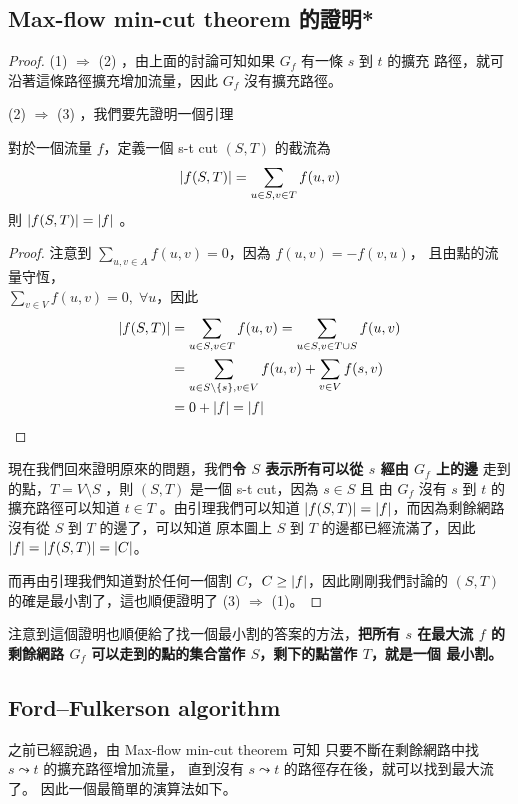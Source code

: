 \documentclass[a4paper,12pt]{book}
\begin{document}
\subsection{Max-flow min-cut theorem 的證明*}
\begin{proof}
  (1) $\Rightarrow$ (2) ，由上面的討論可知如果 $G_f$ 有一條 $s$ 到 $t$ 的擴充
  路徑，就可沿著這條路徑擴充增加流量，因此 $G_f$ 沒有擴充路徑。 
  
  (2) $\Rightarrow$ (3) ，我們要先證明一個引理
\begin{lemma}
  對於一個流量 $f$，定義一個 s-t cut $(S, T)$ 的截流為
  \[ \lvert f(S, T) \rvert = \sum_{u \in S, v \in T} f(u, v) \]
  則 $\lvert f(S, T) \rvert = \lvert f \rvert$ 。
\end{lemma}
\begin{proof}
  注意到 $\sum\limits_{u, v \in A} f(u, v) = 0$，因為 $f(u, v) = -f(v, u)$，
  且由點的流量守恆，\\$\sum\limits_{v \in V} f(u, v) = 0, \; \forall u$，因此
  \begin{align*}
    \lvert f(S, T) \rvert &= \sum_{u \in S, v \in T} f(u, v) 
    = \sum_{u \in S, v \in T \cup S} f(u, v) \\
    &= \sum_{u \in S \setminus \{s\}, v \in V} f(u, v)
     + \sum_{v \in V} f(s, v) \\
     &= 0 + \lvert f \rvert = \lvert f \rvert 
  \end{align*} 
\end{proof}
現在我們回來證明原來的問題，我們{\bf 令 $S$ 表示所有可以從 $s$ 經由 $G_f$ 上的邊}%
走到的點，$T = V \setminus S$ ，則 $(S, T)$ 是一個 s-t cut，因為 $s \in S$ 且
由 $G_f$ 沒有 $s$ 到 $t$ 的擴充路徑可以知道 $t \in T$ 。由引理我們可以知道
$\lvert f(S, T) \rvert = \lvert f \rvert$，而因為剩餘網路沒有從 $S$ 到 $T$ 的邊了，可以知道
原本圖上 $S$ 到 $T$ 的邊都已經流滿了，因此 $\lvert f \rvert = \lvert f(S, T) \rvert = \lvert C \rvert$。

而再由引理我們知道對於任何一個割 $C$，$C \geq \lvert f \rvert$，因此剛剛我們討論的
$(S, T)$的確是最小割了，這也順便證明了 (3) $\Rightarrow$ (1)。
\end{proof}
注意到這個證明也順便給了找一個最小割的答案的方法，{\bf 把所有 $s$ 在最大流 $f$
  的剩餘網路 $G_f$ 可以走到的點的集合當作 $S$，剩下的點當作 $T$，就是一個
  最小割。}

\subsection{Ford–Fulkerson algorithm}
之前已經說過，由 Max-flow min-cut theorem 可知
只要不斷在剩餘網路中找 $s \leadsto t$ 的擴充路徑增加流量，
直到沒有 $s \leadsto t$ 的路徑存在後，就可以找到最大流了。
因此一個最簡單的演算法如下。
\end{document}
